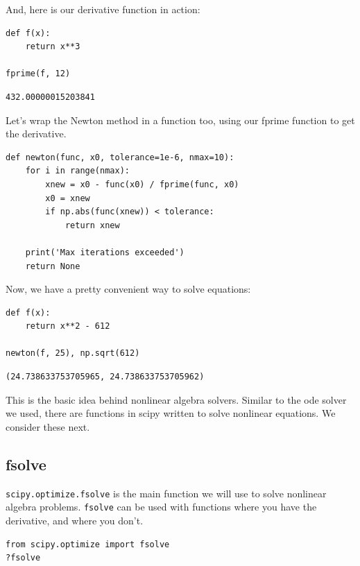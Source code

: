 \documentclass[11pt]{article}
\begin{document}
And, here is our derivative function in action:

\begin{verbatim}
def f(x):
    return x**3

fprime(f, 12)
\end{verbatim}

\begin{verbatim}
432.00000015203841
\end{verbatim}

Let's wrap the Newton method in a function too, using our fprime function to get the derivative.

\begin{verbatim}
def newton(func, x0, tolerance=1e-6, nmax=10):
    for i in range(nmax):
        xnew = x0 - func(x0) / fprime(func, x0)
        x0 = xnew
        if np.abs(func(xnew)) < tolerance:
            return xnew

    print('Max iterations exceeded')
    return None
\end{verbatim}

Now, we have a pretty convenient way to solve equations:

\begin{verbatim}
def f(x):
    return x**2 - 612

newton(f, 25), np.sqrt(612)
\end{verbatim}

\begin{verbatim}
(24.738633753705965, 24.738633753705962)
\end{verbatim}

This is the basic idea behind nonlinear algebra solvers. Similar to the ode solver we used, there are functions in scipy written to solve nonlinear equations. We consider these next.

\subsection{fsolve}
\label{sec:org31e9ac6}

\texttt{scipy.optimize.fsolve} is the main function we will use to solve nonlinear algebra problems. \texttt{fsolve} can be used with functions where you have the derivative, and where you don't.

\begin{verbatim}
from scipy.optimize import fsolve
?fsolve
\end{verbatim}
\end{document}
